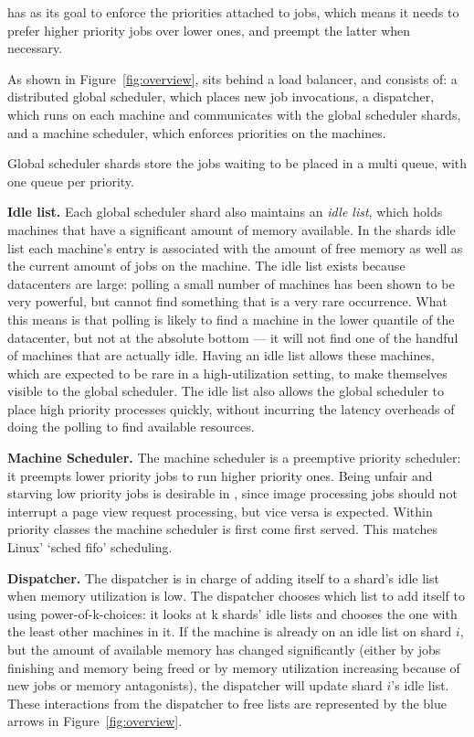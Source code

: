 \Sys{} has as its goal to enforce the priorities attached to jobs, which means
it needs to prefer higher priority jobs over lower ones, and preempt the latter
when necessary.
  

As shown in Figure~\ref{fig:overview}, \sys{} sits behind a load balancer, and
consists of: a distributed global scheduler, which places new job invocations, a
dispatcher, which runs on each machine and communicates with the global
scheduler shards, and a machine scheduler, which enforces priorities on the
machines.

Global scheduler shards store the jobs waiting to be placed in a multi queue,
with one queue per priority.

\textbf{Idle list.}
Each global scheduler shard also maintains an \textit{idle list}, which holds
machines that have a significant amount of memory available. In the shards idle
list each machine's entry is associated with the amount of free memory as well
as the current amount of jobs on the machine. The idle list exists because
datacenters are large: polling a small number of machines has been shown to be
very powerful, but cannot find something that is a very rare occurrence.
What this means is that polling is likely to find a machine in the lower
quantile of the datacenter, but not at the absolute bottom --- it will not find
one of the handful of machines that are actually idle. Having an idle list
allows these machines, which are expected to be rare in a high-utilization
setting, to make themselves visible to the global scheduler. The idle list also
allows the global scheduler to place high priority processes quickly, without
incurring the latency overheads of doing the polling to find available
resources.


\textbf{Machine Scheduler.}
The machine scheduler is a preemptive priority scheduler: it preempts lower
priority jobs to run higher priority ones. Being unfair and starving low
priority jobs is desirable in \sys{}, since image processing jobs should not
interrupt a page view request processing, but vice versa is expected. Within
priority classes the machine scheduler is first come first served. This matches
Linux' `sched fifo' scheduling.


\textbf{Dispatcher.}
The dispatcher is in charge of adding itself to a shard's idle list when memory
utilization is low. The dispatcher chooses which list to add itself to using
power-of-k-choices: it looks at k shards' idle lists and chooses the one with
the least other machines in it. If the machine is already on an idle list on
shard $i$, but the amount of available memory has changed significantly (either
by jobs finishing and memory being freed or by memory utilization increasing
because of new jobs or memory antagonists), the dispatcher will update shard
$i$'s idle list. These interactions from the dispatcher to free lists are
represented by the blue arrows in Figure~\ref{fig:overview}.

